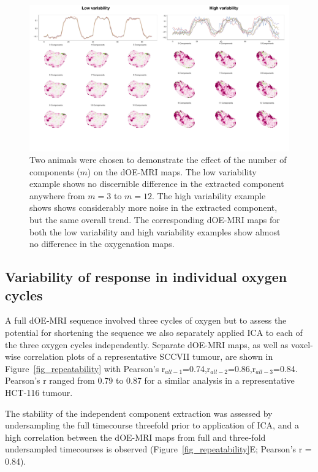 \begin{figure}[htbp]
   \centering
   \includegraphics[width=\textwidth]{oemri_thesis1/oemri_thesis1-images/technical_numComponents.pdf} %
   \caption{Two animals were chosen to demonstrate the effect of the number of components ($m$) on the dOE-MRI maps. The low variability example shows no discernible difference in the extracted component anywhere from $m=3$ to $m=12$. The high variability example shows shows considerably more noise in the extracted component, but the same overall trend. The corresponding dOE-MRI maps for both the low variability and high variability examples show almost no difference in the oxygenation maps.}
   \label{numComponents}
\end{figure}

\subsection{Variability of response in individual oxygen cycles}

A full dOE-MRI sequence involved three cycles of oxygen but to assess the potential for shortening the sequence we also separately applied ICA to each of the three oxygen cycles independently.
Separate dOE-MRI maps, as well as voxel-wise correlation plots of a representative SCCVII tumour, are shown in Figure~\ref{fig_repeatability} with Pearson's r$_{all-1}$=0.74,r$_{all-2}$=0.86,r$_{all-3}$=0.84.
Pearson's r ranged from 0.79 to 0.87 for a similar analysis in a representative HCT-116 tumour.

The stability of the independent component extraction was assessed by undersampling the full timecourse threefold prior to application of ICA, and a high correlation between the dOE-MRI maps from full and three-fold undersampled timecourses is observed (Figure~\ref{fig_repeatability}E; Pearson's r = 0.84). 

